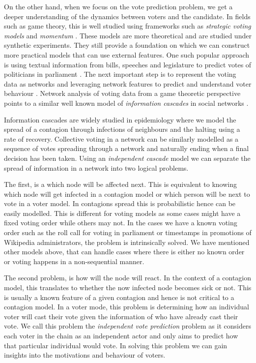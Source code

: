 On the other hand, when we focus on the vote prediction problem, we get a deeper understanding of the dynamics between voters and the candidate. In fields such as game theory, this is well studied using frameworks such as \textit{strategic voting models} and \textit{momentum} \cite{meir2020strategic,zou2015strategicDoodle,ali2006a,banerjee1992simple}. These models are more theoretical and are studied under synthetic experiments. They still provide a foundation on which we can construct more practical models that can use external features. One such popular approach is using textual information from bills, speeches and legislature to predict votes of politicians in parliament \cite{budhwar2018predicting,gerrish2011predicting}. The next important step is to represent the voting data as networks and leveraging network features to predict and understand voter behaviour \cite{tal2015a,brito2020aBrazil,li2015voter,kearns2009behavioral}. Network analysis of voting data from a game theoretic perspective points to a similar well known model of \textit{information cascades} in social networks \cite{ali2006theory,li2015voter}.

Information cascades are widely studied in epidemiology where we model the spread of a contagion through infections of neighbours and the halting using a rate of recovery. Collective voting in a network can be similarly modelled as a sequence of votes spreading through a network and naturally ending when a final decision has been taken. Using an \textit{independent cascade} model we can separate the spread of information in a network into two logical problems.

The first, is a which node will be affected next. This is equivalent to knowing which node will get infected in a contagion model or which person will be next to vote in a voter model. In contagions spread this is probabilistic hence can be easily modelled. This is different for voting models as some cases might have a fixed voting order while others may not. In the cases we have a known voting order such as the roll call for voting in parliament or timestamps in promotions of Wikipedia administrators, the problem is intrinsically solved. We have mentioned other models above, that can handle cases where there is either no known order or voting happens in a non-sequential manner. 

The second problem, is how will the node will react. In the context of a contagion model, this translates to whether the now infected node becomes sick or not. This is usually a known feature of a given contagion and hence is not critical to a contagion model. In a voter mode, this problem is determining how an individual voter will cast their vote given the information of who have already cast their vote. We call this problem the \textit{independent vote prediction} problem as it considers each voter in the chain as an independent actor and only aims to predict how that particular individual would vote. In solving this problem we can gain insights into the motivations and behaviour of voters. 


